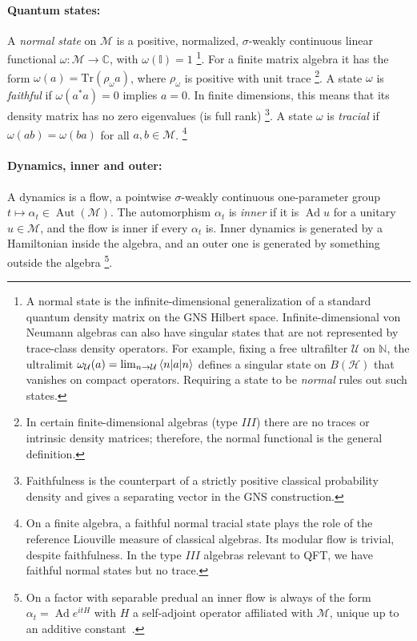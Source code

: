 \documentclass[a4paper,11pt]{article}
\theoremstyle{definition}
\newcommand{\id}{\mathbb{I}}
\newcommand{\Tr}{\text{Tr}}
\newcommand{\mM}{\mathcal{M}}
\begin{document}
\paragraph{Quantum states:}

A \emph{normal state} on $\mM$ is a positive, normalized, $\sigma$-weakly continuous
linear functional $\omega:\mM\to\mathbb{C}$, with $\omega(\id)=1$ \footnote{A normal state is the infinite-dimensional generalization of a standard quantum density matrix on the GNS Hilbert space. Infinite-dimensional von Neumann algebras can also have singular states that are not represented by trace-class density operators. For example, fixing a free ultrafilter $\mathcal U$ on $\mathbb N$, the ultralimit $\omega_{\mathcal U}(a)=\lim_{n\to\mathcal U}\braket{n|a|n}$ defines a singular state on $B(\mathcal H)$ that vanishes on compact operators. Requiring a state to be {\it normal} rules out such states.}.
For a finite matrix algebra it has the form $\omega(a)=\Tr(\rho_\omega a)$,
where $\rho_\omega$ is positive with unit trace \footnote{In certain finite-dimensional algebras (type $III$) there are no traces or intrinsic density matrices; therefore, the normal functional is the general definition.}. A state $\omega$ is \emph{faithful} if $\omega(a^*a)=0$ implies $a=0$.
In finite dimensions, this means that its density matrix has no zero eigenvalues (is full rank) \footnote{Faithfulness is the counterpart of a strictly positive classical probability density
and gives a separating vector in the GNS construction.}. A state $\omega$ is \emph{tracial} if $\omega(ab)=\omega(ba)$ for all $a,b\in\mM$.
\footnote{On a finite algebra, a faithful normal tracial state plays the role of the reference
Liouville measure of classical algebras. Its modular flow is trivial, despite faithfulness. In the type $III$
algebras relevant to QFT, we have faithful normal states but no trace.}

\paragraph{Dynamics, inner and outer:}
A dynamics is a flow, a pointwise $\sigma$-weakly continuous one-parameter group $t\mapsto\alpha_t\in\operatorname{Aut}(\mM)$. The automorphism $\alpha_t$ is \emph{inner} if it is $\operatorname{Ad}u$ for a unitary $u\in\mM$, and the flow is inner if every $\alpha_t$ is. Inner dynamics is generated by a Hamiltonian inside the algebra, and an outer one is generated by something outside the algebra \footnote{On a factor with separable predual an inner flow is always of the form $\alpha_t=\operatorname{Ad}e^{itH}$ with $H$ a self-adjoint operator affiliated with $\mM$, unique up to an additive constant~\cite{Kallman1971}.}. 
\end{document}
